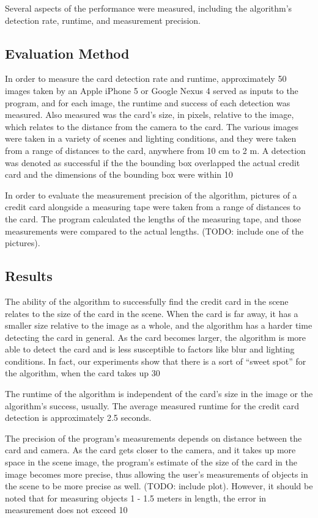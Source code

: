 \documentclass[10pt,twocolumn,letterpaper]{article}
\begin{document}
Several aspects of the performance were measured, including the algorithm’s detection rate, runtime, and measurement precision.

\subsection{Evaluation Method}
	In order to measure the card detection rate and runtime, approximately 50 images taken by an Apple iPhone 5 or Google Nexus 4 served as inputs to the program, and for each image, the runtime and success of each detection was measured. Also measured was the card’s size, in pixels, relative to the image, which relates to the distance from the camera to the card. The various images were taken in a variety of scenes and lighting conditions, and they were taken from a range of distances to the card, anywhere from 10 cm to 2 m. A detection was denoted as successful if the the bounding box overlapped the actual credit card and the dimensions of the bounding box were within 10%

	In order to evaluate the measurement precision of the algorithm, pictures of a credit card alongside a measuring tape were taken from a range of distances to the card. The program calculated the lengths of the measuring tape, and those measurements were compared to the actual lengths. (TODO: include one of the pictures).
\subsection{Results}
	The ability of the algorithm to successfully find the credit card in the scene relates to the size of the card in the scene. When the card is far away, it has a smaller size relative to the image as a whole, and the algorithm has a harder time detecting the card in general. As the card becomes larger, the algorithm is more able to detect the card and is less susceptible to factors like blur and lighting conditions. In fact, our experiments show that there is a sort of 
“sweet spot” for the algorithm, when the card takes up 30%

	The runtime of the algorithm is independent of the card’s size in the image or the algorithm’s success, usually. The average measured runtime for the credit card detection is approximately 2.5 seconds. 

	The precision of the program’s measurements depends on distance between the card and camera. As the card gets closer to the camera, and it takes up more space in the scene image, the program’s estimate of the size of the card in the image becomes more precise, thus allowing the user’s measurements of objects in the scene to be more precise as well. (TODO: include plot). However, it should be noted that for measuring objects 1 - 1.5 meters in length, the error in measurement does not exceed 10%
	
\end{document}
